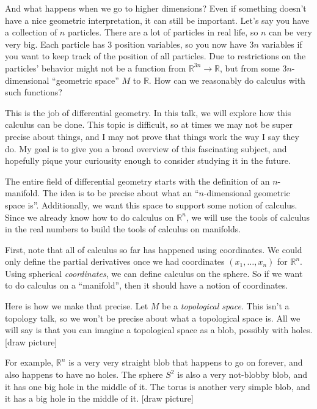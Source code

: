 And what happens when we go to higher dimensions? Even if something doesn't have a nice geometric interpretation, it can still be important. Let's say you have a collection of $n$ particles. There are a lot of particles in real life, so $n$ can be very very big. Each particle has 3 position variables, so you now have $3n$ variables if you want to keep track of the position of all particles. Due to restrictions on the particles' behavior might not be a function from $\mathbb{R} ^{3n} \to \mathbb{R} $, but from some $3n$-dimensional ``geometric space'' $M$ to $\mathbb{R} $. How can we reasonably do calculus with such functions?

This is the job of differential geometry. In this talk, we will explore how this calculus can be done. This topic is difficult, so at times we may not be super precise about things, and I may not prove that things work the way I say they do. My goal is to give you a broad overview of this fascinating subject, and hopefully pique your curiousity enough to consider studying it in the future.

The entire field of differential geometry starts with the definition of an $n$-manifold. The idea is to be precise about what an ``$n$-dimensional geometric space is''. Additionally, we want this space to support some notion of calculus. Since we already know how to do calculus on $\mathbb{R} ^n$, we will use the tools of calculus in the real numbers to build the tools of calculus on manifolds.

First, note that all of calculus so far has happened using coordinates. We could only define the partial derivatives once we had coordinates $(x_1, \ldots , x_n)$ for $\mathbb{R} ^n$. Using spherical \emph{coordinates}, we can define calculus on the sphere. So if we want to do calculus on a ``manifold'', then it should have a notion of coordinates.

Here is how we make that precise. Let $M$ be a \emph{topological space}. This isn't a topology talk, so we won't be precise about what a topological space is. All we will say is that you can imagine a topological space as a blob, possibly with holes. [draw picture]

For example, $\mathbb{R} ^n$ is a very very straight blob that happens to go on forever, and also happens to have no holes. The sphere $S^2$ is also a very not-blobby blob, and it has one big hole in the middle of it. The torus is another very simple blob, and it has a big hole in the middle of it. [draw picture]

